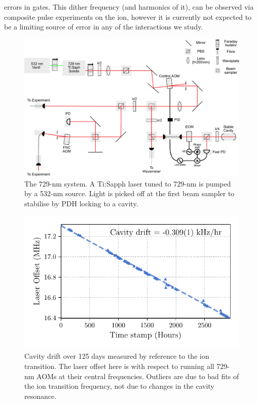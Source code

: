     errors in gates. This dither frequency (and harmonics of it), can be observed 
    via composite pulse experiments on the ion, however it is currently not
    expected to be a limiting source of error in any of the interactions
    we study.\\
    \begin{figure}
    \begin{center}
    \noindent\includegraphics[width=0.9\linewidth]{figures/pdf_figure/729_path_small.pdf}
    \end{center}
    \caption{The 729-nm system. A Ti:Sapph laser tuned to 729-nm is
        pumped by a 532-nm source. Light is picked off at the first beam
        sampler to stabilise by PDH locking to a cavity.}
    \label{fig:729}
    \end{figure}
    \begin{figure}
        \begin{center}
        \noindent\includegraphics[width=0.75\linewidth]{
            figures/pdf_figure/cavity_drift.pdf
            }
        \end{center}
        \caption{
            Cavity drift over 125 days measured by reference to the ion transition. The laser offset here is with respect to running all 729-nm AOMs at their central frequencies. Outliers are due to bad fits of the ion transition frequency, not due to changes in the cavity resonance.
            }
        \label{fig:Cavity Drift}
    \end{figure}
